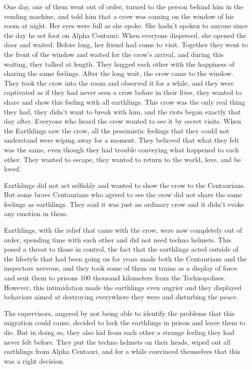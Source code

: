 \documentclass[]{book}
\begin{document}
One day, one of them went out of order, turned to the person behind him in the vending machine, and told him that a crow was coming on the window of his room at night. Her eyes were full as she spoke. She hadn't spoken to anyone since the day he set foot on Alpha Centauri. When everyone dispersed, she opened the door and waited. Before long, her friend had come to visit. Together they went to the front of the window and waited for the crow's arrival, and during this waiting, they talked at length. They hugged each other with the happiness of sharing the same feelings. After the long wait, the crow came to the window. They took the crow into the room and observed it for a while, and they were captivated as if they had never seen a crow before in their lives, they wanted to share and show this feeling with all earthlings. This crow was the only real thing they had, they didn't want to break with him, and the riots began exactly that day after. Everyone who heard the crow wanted to see it by secret visits. When the Earthlings saw the crow, all the pessimistic feelings that they could not understand were wiping away for a moment. They believed that what they felt was the same, even though they had trouble conveying what happened to each other. They wanted to escape, they wanted to return to the world, love, and be loved.

Earthlings did not act selfishly and wanted to show the crow to the Centaurians. But some brave Centaurians who agreed to see the crow did not share the same feelings as earthlings. They said it was just an ordinary crow and it didn't evoke any emotion in them.

Earthlings, with the relief that came with the crow, were now completely out of order, spending time with each other and did not need techno helmets. This posed a threat to those in control, the fact that the earthlings acted outside of the lifestyle that had been going on for years made both the Centaurians and the inspectors nervous, and they took some of them on trains as a display of force and sent them to prisons 100 thousand kilometers from the Technopolises. However, this intimidation made the earthlings even angrier and they displayed behaviors aimed at destroying everywhere they were and disturbing the peace.

The supervisors, angered by not being able to identify the problems that this migration could cause, decided to lock the earthlings in prison and leave them to die. But in doing so, they also hid from each other a strange feeling they had never felt before. They put the techno helmets on their heads, wiped out all earthlings from Alpha Centauri, and for a while convinced themselves that this was a right decision.
\end{document}
